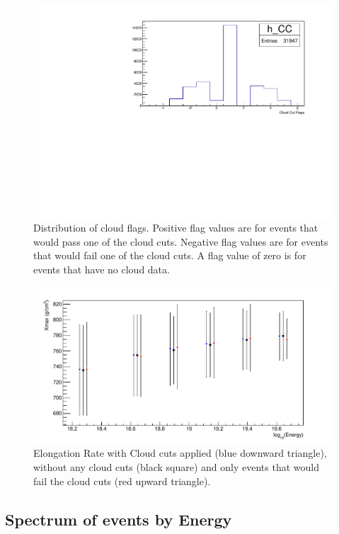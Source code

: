 \begin{figure}
\centering
\includegraphics[width=\textwidth]{chapters/graphs/CloudFlags/hist_cloudFlags.pdf}
\caption{Distribution of cloud flags. Positive flag values are for events that would pass one of the cloud cuts. Negative flag values are for events that would fail one of the cloud cuts. A flag value of zero is for events that have no cloud data.}\label{fig:cloudFlag_dist}
\end{figure}

\begin{figure}
\centering
\includegraphics[width=\textwidth]{chapters/graphs/CloudFlags/ElongationRate.pdf}
\caption{Elongation Rate with Cloud cuts applied (blue downward triangle), without any cloud cuts (black square) and only events that would fail the cloud cuts (red upward triangle).} \label{fig:ElongRate_hist}
\end{figure}


\subsection{Spectrum of events by Energy}

